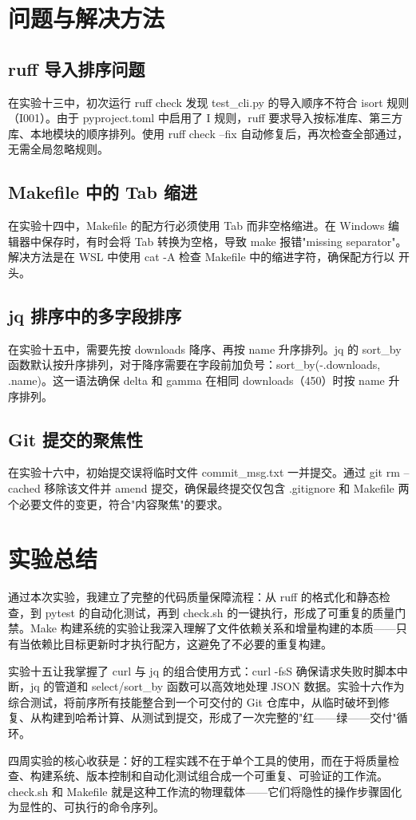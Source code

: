 \documentclass[UTF8]{ctexart}
\begin{document}
\section{问题与解决方法}

\subsection{ruff 导入排序问题}

在实验十三中，初次运行 ruff check 发现 test\_cli.py 的导入顺序不符合 isort 规则（I001）。由于 pyproject.toml 中启用了 I 规则，ruff 要求导入按标准库、第三方库、本地模块的顺序排列。使用 ruff check --fix 自动修复后，再次检查全部通过，无需全局忽略规则。

\subsection{Makefile 中的 Tab 缩进}

在实验十四中，Makefile 的配方行必须使用 Tab 而非空格缩进。在 Windows 编辑器中保存时，有时会将 Tab 转换为空格，导致 make 报错"missing separator"。解决方法是在 WSL 中使用 cat -A 检查 Makefile 中的缩进字符，确保配方行以 \texttt{\textasciitab} 开头。

\subsection{jq 排序中的多字段排序}

在实验十五中，需要先按 downloads 降序、再按 name 升序排列。jq 的 sort\_by 函数默认按升序排列，对于降序需要在字段前加负号：sort\_by(-.downloads, .name)。这一语法确保 delta 和 gamma 在相同 downloads（450）时按 name 升序排列。

\subsection{Git 提交的聚焦性}

在实验十六中，初始提交误将临时文件 commit\_msg.txt 一并提交。通过 git rm --cached 移除该文件并 amend 提交，确保最终提交仅包含 .gitignore 和 Makefile 两个必要文件的变更，符合"内容聚焦"的要求。

\section{实验总结}

通过本次实验，我建立了完整的代码质量保障流程：从 ruff 的格式化和静态检查，到 pytest 的自动化测试，再到 check.sh 的一键执行，形成了可重复的质量门禁。Make 构建系统的实验让我深入理解了文件依赖关系和增量构建的本质——只有当依赖比目标更新时才执行配方，这避免了不必要的重复构建。

实验十五让我掌握了 curl 与 jq 的组合使用方式：curl -fsS 确保请求失败时脚本中断，jq 的管道和 select/sort\_by 函数可以高效地处理 JSON 数据。实验十六作为综合测试，将前序所有技能整合到一个可交付的 Git 仓库中，从临时破坏到修复、从构建到哈希计算、从测试到提交，形成了一次完整的"红——绿——交付"循环。

四周实验的核心收获是：好的工程实践不在于单个工具的使用，而在于将质量检查、构建系统、版本控制和自动化测试组合成一个可重复、可验证的工作流。check.sh 和 Makefile 就是这种工作流的物理载体——它们将隐性的操作步骤固化为显性的、可执行的命令序列。
\end{document}

